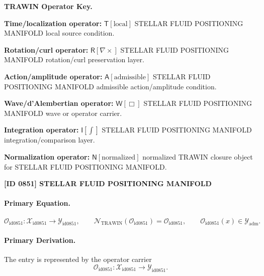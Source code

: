 \par\vspace{0.45\baselineskip}
\noindent\begin{minipage}[t]{\linewidth}
\begingroup
\small
\raggedright
\textbf{TRAWIN Operator Key.}\par
\noindent\textbf{Time/localization operator:} $\mathsf{T}\!\left[\mathrm{local}\right]$ STELLAR FLUID POSITIONING MANIFOLD local source condition.\par
\noindent\textbf{Rotation/curl operator:} $\mathsf{R}\!\left[\nabla\times\right]$ STELLAR FLUID POSITIONING MANIFOLD rotation/curl preservation layer.\par
\noindent\textbf{Action/amplitude operator:} $\mathsf{A}\!\left[\mathrm{admissible}\right]$ STELLAR FLUID POSITIONING MANIFOLD admissible action/amplitude condition.\par
\noindent\textbf{Wave/d'Alembertian operator:} $\mathsf{W}\!\left[\Box\right]$ STELLAR FLUID POSITIONING MANIFOLD wave or operator carrier.\par
\noindent\textbf{Integration operator:} $\mathsf{I}\!\left[\int\right]$ STELLAR FLUID POSITIONING MANIFOLD integration/comparison layer.\par
\noindent\textbf{Normalization operator:} $\mathsf{N}\!\left[\mathrm{normalized}\right]$ normalized TRAWIN closure object for STELLAR FLUID POSITIONING MANIFOLD.\par
\endgroup
\end{minipage}

\clearpage
\noindent\textbf{[ID 0851] STELLAR FLUID POSITIONING MANIFOLD}\par
\vspace{0.35em}
\paragraph{Primary Equation.}
\[
\mathcal{O}_{\mathrm{id0851}}:\mathcal{X}_{\mathrm{id0851}}\longrightarrow \mathcal{Y}_{\mathrm{id0851}},\qquad
\mathcal{N}_{\mathrm{TRAWIN}}(\mathcal{O}_{\mathrm{id0851}})=\mathcal{O}_{\mathrm{id0851}},\qquad
\mathcal{O}_{\mathrm{id0851}}(x)\in\mathcal{Y}_{\mathrm{adm}}.
\]

\paragraph{Primary Derivation.} The entry is represented by the operator carrier\[
\mathcal{O}_{\mathrm{id0851}}:\mathcal{X}_{\mathrm{id0851}}\longrightarrow \mathcal{Y}_{\mathrm{id0851}}.
\]

